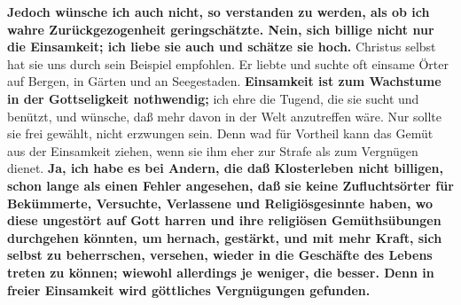 \medskip

 \textbf{Jedoch wünsche ich auch nicht, so verstanden zu werden, als ob ich wahre
Zurückgezogenheit geringschätzte. Nein, sich billige nicht nur die Einsamkeit;
ich liebe sie auch und schätze sie hoch.} Christus selbst hat sie uns durch
sein Beispiel empfohlen. Er liebte und suchte oft einsame Örter auf Bergen, in
Gärten und an Seegestaden. \textbf{Einsamkeit ist zum Wachstume in der Gottseligkeit
nothwendig;} ich ehre die Tugend, die sie sucht und benützt, und wünsche, daß
mehr davon in der Welt anzutreffen wäre. Nur sollte sie frei gewählt, nicht
erzwungen sein. Denn wad für Vortheil kann das Gemüt aus der Einsamkeit ziehen,
wenn sie ihm eher zur Strafe als zum Vergnügen dienet. \textbf{Ja, ich habe es
bei
Andern, die daß Klosterleben  nicht billigen, schon lange als einen Fehler
angesehen, daß sie keine Zufluchtsörter  für Bekümmerte, Versuchte, Verlassene
und Religiösgesinnte haben, wo diese ungestört auf Gott harren und ihre
religiösen Gemüthsübungen durchgehen könnten, um hernach, gestärkt, und mit mehr
Kraft, sich selbst zu beherrschen, versehen, wieder in die Geschäfte des Lebens
treten zu können; wiewohl allerdings je weniger, die besser. Denn in freier
Einsamkeit wird göttliches Vergnügungen gefunden.}



